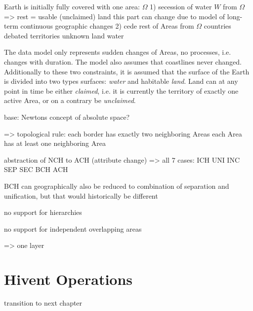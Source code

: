 

Earth is initially fully covered with one area: $\Omega$
1) secession of water $W$ from $\Omega$
    => rest = usable (unclaimed) land
    this part can change due to model of long-term continuous geographic changes
2) cede rest of Areas from $\Omega$
  countries
  debated territories
  unknown land
  water

The data model only represents sudden changes of Areas, no processes, i.e. changes with duration. The model also assumes that coastlines never changed. Additionally to these two constraints, it is assumed that the surface of the Earth is divided into two types surfaces: \emph{water} and habitable \emph{land}. Land can at any point in time be either \emph{claimed}, i.e. it is currently the territory of exactly one active Area, or on a contrary be \emph{unclaimed}.

base: Newtons concept of absolute space?

=> topological rule:
each border has exactly two neighboring Areas
each Area has at least one neighboring Area

abstraction of NCH to ACH (attribute change) => all 7 cases:
ICH
UNI INC
SEP SEC
BCH ACH

BCH can geographically also be reduced to combination of separation and unification, but that would historically be different

no support for hierarchies

no support for independent overlapping areas

=> one layer


\section{Hivent Operations} %
\label{sec:hivent_operations}





\vspace{2em}
transition to next chapter

